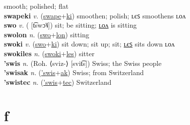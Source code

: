 smooth; polished; flat \label{swapelon} \\
\textbf{swapeki} \textit{v.} (\hyperref[swape]{swape}+\hyperref[ki]{ki})
smoothen; polish; ʟєꜱ smoothens ʟᴏᴧ \label{swapeki} \\
\textbf{swo} \textit{v.} ( [t͡swɔ˥˩])
sit; be sitting; \hyperref[swolon]{ʟᴏᴧ} is sitting \label{swo} \\
\textbf{swolon} \textit{n.} (\hyperref[swo]{swo}+\hyperref[lon]{lon})
sitting \label{swolon} \\
\textbf{swoki} \textit{v.} (\hyperref[swo]{swo}+\hyperref[ki]{ki})
sit down; sit up; sit; \hyperref[swokiles]{ʟєꜱ} sits down ʟᴏᴧ \label{swoki} \\
\textbf{swokiles} \textit{n.} (\hyperref[swoki]{swoki}+\hyperref[les]{les})
sitter \label{swokiles} \\
\textbf{'swis} \textit{n.} (Roh. ⟨sviz-⟩ [svit͡s])
Swiss; the Swiss people \label{'swis} \\
\textbf{'swisak} \textit{n.} (\hyperref['swis]{'swis}+\hyperref[ak]{ak})
Swiss; from Switzerland \label{'swisak} \\
\textbf{'swistec} \textit{n.} (\hyperref['swis]{'swis}+\hyperref[tec]{tec})
Switzerland \label{'swistec} 

\section{f}

